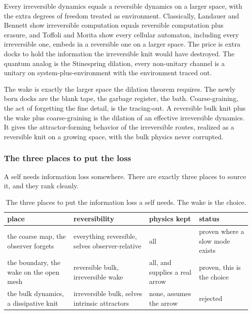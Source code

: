 \begin{theorem}
Every irreversible dynamics equals a reversible dynamics on a larger space, with the extra degrees of freedom treated as environment. Classically, Landauer and Bennett show irreversible computation equals reversible computation plus erasure, and Toffoli and Morita show every cellular automaton, including every irreversible one, embeds in a reversible one on a larger space. The price is extra docks to hold the information the irreversible knit would have destroyed. The quantum analog is the Stinespring dilation, every non-unitary channel is a unitary on system-plus-environment with the environment traced out.
\end{theorem}

\begin{result}
The wake is exactly the larger space the dilation theorem requires. The newly born docks are the blank tape, the garbage register, the bath. Coarse-graining, the act of forgetting the fine detail, is the tracing-out. A reversible bulk knit plus the wake plus coarse-graining is the dilation of an effective irreversible dynamics. It gives the attractor-forming behavior of the irreversible routes, realized as a reversible knit on a growing space, with the bulk physics never corrupted.
\end{result}

\subsubsection{The three places to put the loss}

A self needs information loss somewhere. There are exactly three places to source it, and they rank cleanly.

\begin{table}[ht]
\centering
\begin{tabular}{@{}p{}p{}p{}p{}@{}}
\toprule
place & reversibility & physics kept & status \\
\midrule
the coarse map, the observer forgets & everything reversible, selves observer-relative & all & proven where a slow mode exists \\
the boundary, the wake on the open mesh & reversible bulk, irreversible wake & all, and supplies a real arrow & proven, this is the choice \\
the bulk dynamics, a dissipative knit & irreversible bulk, selves intrinsic attractors & none, assumes the arrow & rejected \\
\bottomrule
\end{tabular}
\caption{The three places to put the information loss a self needs. The wake is the choice.}
\label{tab:three-places}
\end{table}


